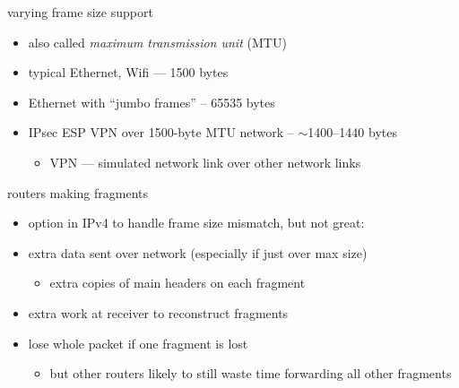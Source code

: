 \begin{frame}{varying frame size support}
    \begin{itemize}
    \item also called \textit{maximum transmission unit} (MTU)
    \vspace{.5cm}
    \item typical Ethernet, Wifi --- 1500 bytes
    \item Ethernet with ``jumbo frames'' -- 65535 bytes
    \item IPsec ESP VPN over 1500-byte MTU network -- $\sim$1400--1440 bytes
        \begin{itemize}
        \item VPN --- simulated network link over other network links
        \end{itemize}
    \end{itemize}
\end{frame}

\begin{frame}{routers making fragments}
    \begin{itemize}
    \item option in IPv4 to handle frame size mismatch, but not great:
    \vspace{.5cm}
    \item extra data sent over network (especially if just over max size)
        \begin{itemize}
        \item extra copies of main headers on each fragment
        \end{itemize}
    \item extra work at receiver to reconstruct fragments
    \item lose whole packet if one fragment is lost
        \begin{itemize}
        \item but other routers likely to still waste time forwarding all other fragments
        \end{itemize}
    \end{itemize}
\end{frame}

